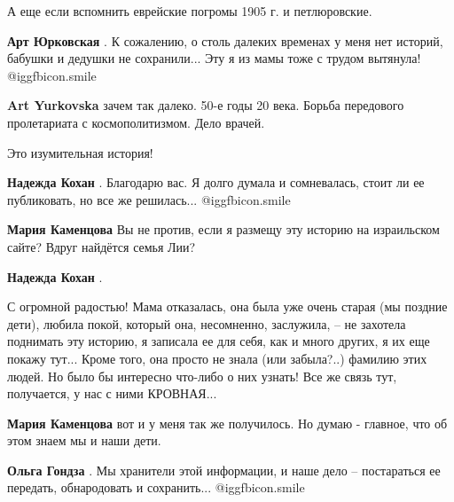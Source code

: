  
 
 
 
 
\zzSecCmt

\begin{itemize} %

А еще если вспомнить еврейские погромы 1905 г. и петлюровские.

\begin{itemize} %
\textbf{Арт Юрковская} . К сожалению, о столь далеких временах у меня нет историй, бабушки и дедушки не сохранили... Эту я из мамы тоже с трудом вытянула!  @igg{fbicon.smile} 

\textbf{Art Yurkovska} зачем так далеко. 50-е годы 20 века. Борьба передового пролетариата с космополитизмом. Дело врачей.
\end{itemize} %

Это изумительная история!

\begin{itemize} %
\textbf{Надежда Кохан} . Благодарю вас. Я долго думала и сомневалась, стоит ли ее публиковать, но все же решилась...  @igg{fbicon.smile} 

\begin{itemize} %
\textbf{Мария Каменцова} Вы не против, если я размещу эту историю на израильском сайте? Вдруг найдётся семья Лии?

\textbf{Надежда Кохан} . 

С огромной радостью! Мама отказалась, она была уже очень старая (мы поздние
дети), любила покой, который она, несомненно, заслужила, – не захотела
поднимать эту историю, я записала ее для себя, как и много других, я их еще
покажу тут... Кроме того, она просто не знала (или забыла?..) фамилию этих
людей. Но было бы интересно что-либо о них узнать! Все же связь тут,
получается, у нас с ними КРОВНАЯ...

\textbf{Мария Каменцова} вот и у меня так же получилось. Но думаю - главное, что об этом знаем мы и наши дети.

\textbf{Ольга Гондза} . Мы хранители этой информации, и наше дело – постараться ее передать, обнародовать и сохранить...  @igg{fbicon.smile} 


\end{itemize}
\end{itemize}
\end{itemize}
